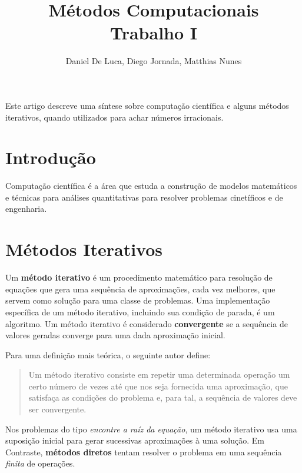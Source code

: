 \documentclass[a4paper]{article}
\author{Daniel De Luca, Diego Jornada, Matthias Nunes}
\title{Métodos Computacionais \\ Trabalho I}
\begin{document}
\maketitle

\begin{resumo}

Este artigo descreve uma síntese sobre computação científica e alguns métodos
iterativos, quando utilizados para achar números irracionais.

\end{resumo}

\section{Introdução}

Computação científica é a área que estuda a construção de modelos matemáticos e
técnicas para análises quantitativas para resolver problemas cinetíficos e de
engenharia.

\section{Métodos Iterativos}

Um \textbf{método iterativo} é um procedimento matemático para resolução de equações que gera uma sequência de aproximações, cada vez melhores, que servem como solução para uma classe de problemas. Uma implementação específica de um método iterativo, incluindo sua condição de parada, é um algoritmo. Um método iterativo é considerado \textbf{convergente} se a sequência de valores geradas converge para uma dada aproximação inicial.

Para uma definição mais teórica, o seguinte autor define:

\begin{quotation}
Um método iterativo consiste em repetir uma determinada operação um certo número de vezes até que nos seja fornecida uma aproximação, que satisfaça as condições do problema e, para tal, a sequência de valores deve ser convergente.\cite{batista2014metodos}

\end{quotation}

Nos problemas do tipo \emph{encontre a raíz da equação}, um método iterativo usa uma suposição inicial para gerar sucessivas aproximações à uma solução. Em Contraste, \textbf{métodos diretos} tentam resolver o problema em uma sequência \emph{finita} de operações.
\end{document}
